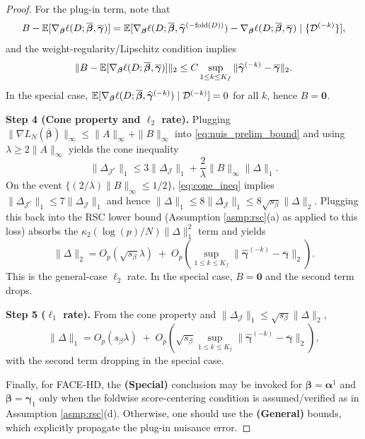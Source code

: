\documentclass{article}
\begin{document}
\begin{proof}
For the plug-in term, note that
\[
B-\operatorname{\mathbb{E}}[\nabla_{\boldsymbol{\beta}}\ell(D;\overline{\boldsymbol{\beta}},\overline{\boldsymbol{\gamma}})]
=
\operatorname{\mathbb{E}}[\nabla_{\boldsymbol{\beta}}\ell(D;\overline{\boldsymbol{\beta}},\widehat{\boldsymbol{\gamma}}^{(-\mathrm{fold}(D))})
-\nabla_{\boldsymbol{\beta}}\ell(D;\overline{\boldsymbol{\beta}},\overline{\boldsymbol{\gamma}})
\mid \{\mathcal{D}^{(-k)}\}],
\]
and the weight-regularity/Lipschitz condition implies
\[
\|B-\operatorname{\mathbb{E}}[\nabla_{\boldsymbol{\beta}}\ell(D;\overline{\boldsymbol{\beta}},\overline{\boldsymbol{\gamma}})]\|_2
\le
C\sup_{1\le k\le K_f}\|\widehat{\boldsymbol{\gamma}}^{(-k)}-\overline{\boldsymbol{\gamma}}\|_2.
\]
In the special case, $\operatorname{\mathbb{E}}[\nabla_{\boldsymbol{\beta}}\ell(D;\overline{\boldsymbol{\beta}},\widehat{\boldsymbol{\gamma}}^{(-k)})\mid\mathcal{D}^{(-k)}]=0$ for all $k$, hence $B=\mathbf{0}$.

\textbf{Step 4 (Cone property and $\ell_2$ rate).}
Plugging $\|\nabla L_N(\overline{\boldsymbol{\beta}})\|_\infty\le \|A\|_\infty+\|B\|_\infty$ into \eqref{eq:nuis_prelim_bound} and using $\lambda\ge 2\|A\|_\infty$ yields the cone inequality
\begin{equation}\label{eq:cone_ineq}
\|\Delta_{\mathcal{J}^c}\|_1 \le 3\|\Delta_{\mathcal{J}}\|_1 + \frac{2}{\lambda}\|B\|_\infty\|\Delta\|_1.
\end{equation}
On the event $\{(2/\lambda)\|B\|_\infty\le 1/2\}$, \eqref{eq:cone_ineq} implies $\|\Delta_{\mathcal{J}^c}\|_1\le 7\|\Delta_{\mathcal{J}}\|_1$ and hence $\|\Delta\|_1\le 8\|\Delta_{\mathcal{J}}\|_1\le 8\sqrt{s_\beta}\|\Delta\|_2$.
Plugging this back into the RSC lower bound (Assumption \ref{asmp:rsc}(a) as applied to this loss) absorbs the $\kappa_2(\log(p)/N)\|\Delta\|_1^2$ term and yields
\[
\|\Delta\|_2
=
O_p(\sqrt{s_\beta}\lambda)
\;+\;
O_p\!\left(\sup_{1\le k\le K_f}\|\widehat{\boldsymbol{\gamma}}^{(-k)}-\overline{\boldsymbol{\gamma}}\|_2\right).
\]
This is the general-case $\ell_2$ rate. In the special case, $B=\mathbf{0}$ and the second term drops.

\textbf{Step 5 ($\ell_1$ rate).}
From the cone property and $\|\Delta_{\mathcal{J}}\|_1\le \sqrt{s_\beta}\|\Delta\|_2$,
\[
\|\Delta\|_1
=
O_p(s_\beta\lambda)
\;+\;
O_p\!\left(\sqrt{s_\beta}\sup_{1\le k\le K_f}\|\widehat{\boldsymbol{\gamma}}^{(-k)}-\overline{\boldsymbol{\gamma}}\|_2\right),
\]
with the second term dropping in the special case.

Finally, for FACE-HD, the \textbf{(Special)} conclusion may be invoked for $\boldsymbol{\beta}=\boldsymbol{\alpha}^1$ and $\boldsymbol{\beta}=\boldsymbol{\gamma}_1$ only when the foldwise score-centering condition is assumed/verified as in Assumption \ref{asmp:rsc}(d). Otherwise, one should use the \textbf{(General)} bounds, which explicitly propagate the plug-in nuisance error.
\end{proof}
\end{document}
